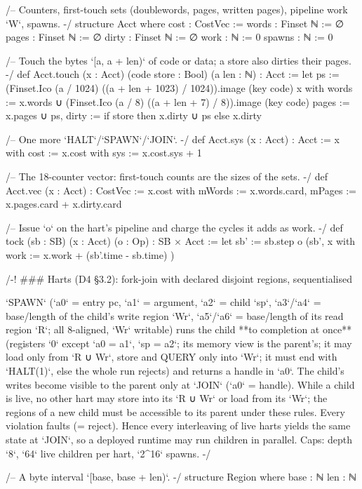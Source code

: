 \begin{leancode}[fontsize=\scriptsize,label={\footnotesize Contract/Machine.lean}]
/-- Counters, first-touch sets (doublewords, pages, written pages), pipeline work `W`, spawns. -/
structure Acct where
  cost : CostVec := {}
  words : Finset ℕ := ∅
  pages : Finset ℕ := ∅
  dirty : Finset ℕ := ∅
  work : ℕ := 0
  spawns : ℕ := 0

/-- Touch the bytes `[a, a + len)` of code or data; a store also dirties their pages. -/
def Acct.touch (x : Acct) (code store : Bool) (a len : ℕ) : Acct :=
  let ps := (Finset.Ico (a / 1024) ((a + len + 1023) / 1024)).image (key code)
  { x with words := x.words ∪ (Finset.Ico (a / 8) ((a + len + 7) / 8)).image (key code)
           pages := x.pages ∪ ps, dirty := if store then x.dirty ∪ ps else x.dirty }

/-- One more `HALT`/`SPAWN`/`JOIN`. -/
def Acct.sys (x : Acct) : Acct := { x with cost := { x.cost with sys := x.cost.sys + 1 } }

/-- The 18-counter vector: first-touch counts are the sizes of the sets. -/
def Acct.vec (x : Acct) : CostVec :=
  { x.cost with mWords := x.words.card, mPages := x.pages.card + x.dirty.card }

/-- Issue `o` on the hart's pipeline and charge the cycles it adds as work. -/
def tock (sb : SB) (x : Acct) (o : Op) : SB × Acct :=
  let sb' := sb.step o
  (sb', { x with work := x.work + (sb'.time - sb.time) })

/-! ### Harts (D4 §3.2): fork-join with declared disjoint regions, sequentialised

`SPAWN` (`a0` = entry pc, `a1` = argument, `a2` = child `sp`, `a3`/`a4` = base/length of the
child's write region `Wr`, `a5`/`a6` = base/length of its read region `R`; all 8-aligned, `Wr`
writable) runs the child **to completion at once** (registers `0` except `a0 = a1`, `sp = a2`;
its memory view is the parent's; it may load only from `R ∪ Wr`, store and QUERY only into
`Wr`; it must end with `HALT(1)`, else the whole run rejects) and returns a handle in `a0`. The
child's writes become visible to the parent only at `JOIN` (`a0` = handle). While a child is
live, no other hart may store into its `R ∪ Wr` or load from its `Wr`; the regions of a new
child must be accessible to its parent under these rules. Every violation faults (= reject).
Hence every interleaving of live harts yields the same state at `JOIN`, so a deployed runtime
may run children in parallel. Caps: depth `8`, `64` live children per hart, `2^16` spawns. -/

/-- A byte interval `[base, base + len)`. -/
structure Region where
  base : ℕ
  len : ℕ


\end{leancode}
